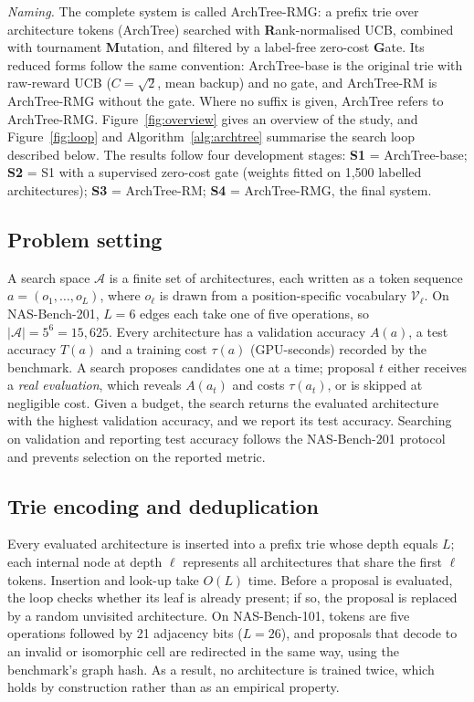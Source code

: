 \documentclass{sadhana}
\newcommand{\algname}{ArchTree}
\newcommand{\rmg}{ArchTree-RMG}
\begin{document}
\textit{Naming.} The complete system is called \rmg: a prefix trie over architecture tokens (\algname) searched with \textbf{R}ank-normalised UCB, combined with tournament \textbf{M}utation, and filtered by a label-free zero-cost \textbf{G}ate. Its reduced forms follow the same convention: \algname-base is the original trie with raw-reward UCB ($C=\sqrt2$, mean backup) and no gate, and \algname-RM is \rmg{} without the gate. Where no suffix is given, \algname{} refers to \rmg. Figure~\ref{fig:overview} gives an overview of the study, and Figure~\ref{fig:loop} and Algorithm~\ref{alg:archtree} summarise the search loop described below. The results follow four development stages: \textbf{S1} = \algname-base; \textbf{S2} = S1 with a supervised zero-cost gate (weights fitted on 1,500 labelled architectures); \textbf{S3} = \algname-RM; \textbf{S4} = \rmg, the final system.

\subsection{Problem setting}\label{sec:setting}

A search space $\mathcal{A}$ is a finite set of architectures, each written as a token sequence $a=(o_1,\dots,o_L)$, where $o_\ell$ is drawn from a position-specific vocabulary $\mathcal{V}_\ell$. On NAS-Bench-201, $L=6$ edges each take one of five operations, so $|\mathcal{A}|=5^6=15{,}625$. Every architecture has a validation accuracy $A(a)$, a test accuracy $T(a)$ and a training cost $\tau(a)$ (GPU-seconds) recorded by the benchmark. A search proposes candidates one at a time; proposal $t$ either receives a \emph{real evaluation}, which reveals $A(a_t)$ and costs $\tau(a_t)$, or is skipped at negligible cost. Given a budget, the search returns the evaluated architecture with the highest validation accuracy, and we report its test accuracy. Searching on validation and reporting test accuracy follows the NAS-Bench-201 protocol \cite{dong2020} and prevents selection on the reported metric.

\subsection{Trie encoding and deduplication}

Every evaluated architecture is inserted into a prefix trie whose depth equals $L$; each internal node at depth $\ell$ represents all architectures that share the first $\ell$ tokens. Insertion and look-up take $O(L)$ time. Before a proposal is evaluated, the loop checks whether its leaf is already present; if so, the proposal is replaced by a random unvisited architecture. On NAS-Bench-101, tokens are five operations followed by 21 adjacency bits ($L=26$), and proposals that decode to an invalid or isomorphic cell are redirected in the same way, using the benchmark's graph hash. As a result, no architecture is trained twice, which holds by construction rather than as an empirical property.
\end{document}
